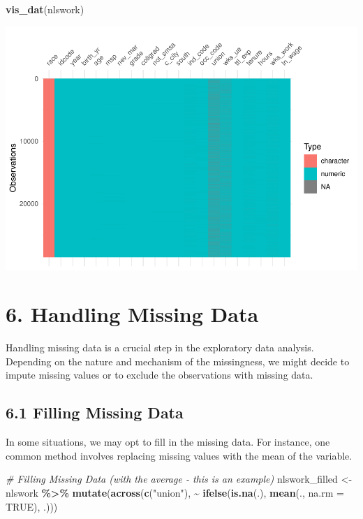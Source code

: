 \documentclass[
]{article}
\newenvironment{Shaded}{\begin{snugshade}}{\end{snugshade}}
\newcommand{\AttributeTok}[1]{\textcolor[rgb]{0.13,0.29,0.53}{#1}}
\newcommand{\CommentTok}[1]{\textcolor[rgb]{0.56,0.35,0.01}{\textit{#1}}}
\newcommand{\ConstantTok}[1]{\textcolor[rgb]{0.56,0.35,0.01}{#1}}
\newcommand{\FunctionTok}[1]{\textcolor[rgb]{0.13,0.29,0.53}{\textbf{#1}}}
\newcommand{\NormalTok}[1]{#1}
\newcommand{\OtherTok}[1]{\textcolor[rgb]{0.56,0.35,0.01}{#1}}
\newcommand{\SpecialCharTok}[1]{\textcolor[rgb]{0.81,0.36,0.00}{\textbf{#1}}}
\newcommand{\StringTok}[1]{\textcolor[rgb]{0.31,0.60,0.02}{#1}}
\begin{document}
\begin{Shaded}
\begin{Highlighting}[]
\FunctionTok{vis\_dat}\NormalTok{(nlswork)}
\end{Highlighting}
\end{Shaded}

\includegraphics{RIntro_files/figure-latex/unnamed-chunk-10-1.pdf}

\hypertarget{handling-missing-data}{%
\section{6. Handling Missing Data}\label{handling-missing-data}}

Handling missing data is a crucial step in the exploratory data
analysis. Depending on the nature and mechanism of the missingness, we
might decide to impute missing values or to exclude the observations
with missing data.

\hypertarget{filling-missing-data}{%
\subsection{6.1 Filling Missing Data}\label{filling-missing-data}}

In some situations, we may opt to fill in the missing data. For
instance, one common method involves replacing missing values with the
mean of the variable.

\begin{Shaded}
\begin{Highlighting}[]
\CommentTok{\# Filling Missing Data (with the average {-} this is an example)}
\NormalTok{nlswork\_filled }\OtherTok{\textless{}{-}}\NormalTok{ nlswork }\SpecialCharTok{\%\textgreater{}\%}
  \FunctionTok{mutate}\NormalTok{(}\FunctionTok{across}\NormalTok{(}\FunctionTok{c}\NormalTok{(}\StringTok{"union"}\NormalTok{), }\SpecialCharTok{\textasciitilde{}} \FunctionTok{ifelse}\NormalTok{(}\FunctionTok{is.na}\NormalTok{(.), }\FunctionTok{mean}\NormalTok{(., }\AttributeTok{na.rm =} \ConstantTok{TRUE}\NormalTok{), .))) }
\end{Highlighting}
\end{Shaded}
\end{document}
